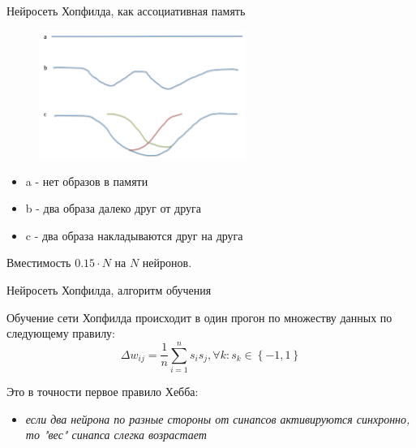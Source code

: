 \documentclass[10pt]{beamer}
\begin{document}
\begin{frame}{Нейросеть Хопфилда, как ассоциативная память}

\begin{figure}[h!]
  \centering
  \includegraphics[width=0.6\textwidth]{images/hop_fail.png}
\end{figure}

\begin{itemize}
	\item a - нет образов в памяти
	\item b - два образа далеко друг от друга
	\item c - два образа накладываются друг на друга
\end{itemize}

Вместимость $0.15\cdot N$ на $N$ нейронов.

\end{frame}


\begin{frame}{Нейросеть Хопфилда, алгоритм обучения}

Обучение сети Хопфилда происходит в один прогон по множеству данных по следующему правилу:
\begin{equation}
\Delta w_{ij} = \frac{1}{n} \sum_{i=1}^{n} s_i s_j, \forall k: s_k \in \left\{-1, 1\right\}
\end{equation}

Это в точности первое правило Хебба:
\begin{itemize}
	\item \textit{если два нейрона по разные стороны от синапсов активируются синхронно, то "вес" синапса слегка возрастает}
\end{itemize}

\end{frame}
\end{document}
